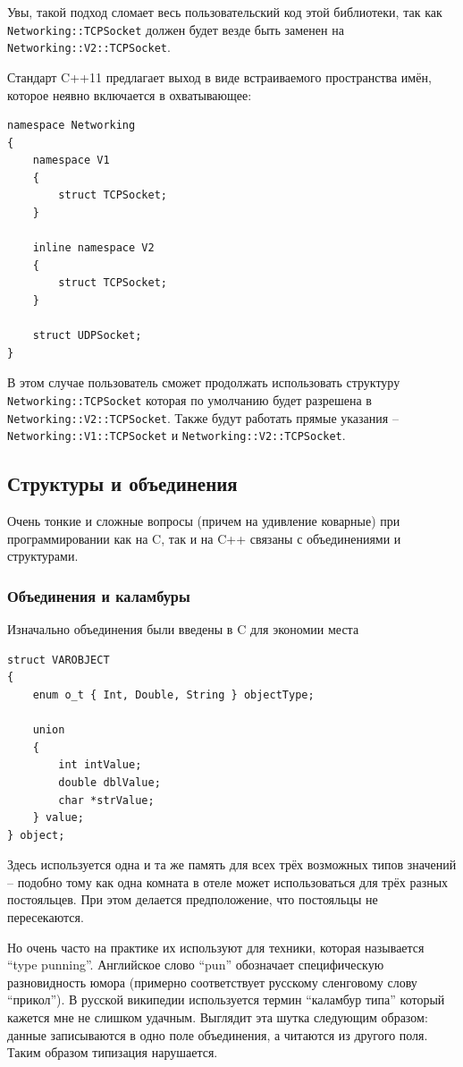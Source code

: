 \documentclass[a4paper,12pt,oneside]{article}
\begin{document}
Увы, такой подход сломает весь пользовательский код этой библиотеки, так как \lstinline!Networking::TCPSocket! должен будет везде быть заменен на \lstinline!Networking::V2::TCPSocket!.

Стандарт C++11 предлагает выход в виде встраиваемого пространства имён, которое неявно включается в охватывающее:

\begin{lstlisting}
namespace Networking 
{
    namespace V1 
    {
        struct TCPSocket;
    }
     
    inline namespace V2 
    {
        struct TCPSocket;
    }
 
    struct UDPSocket;
}
\end{lstlisting}

В этом случае пользователь сможет продолжать использовать структуру \lstinline!Networking::TCPSocket! которая по умолчанию будет разрешена в \lstinline!Networking::V2::TCPSocket!. Также будут работать прямые указания -- \lstinline!Networking::V1::TCPSocket! и \lstinline!Networking::V2::TCPSocket!.

\subsection{Структуры и объединения}

Очень тонкие и сложные вопросы (причем на удивление коварные) при программировании как на C, так и на C++ связаны с объединениями и структурами.

\subsubsection{Объединения и каламбуры}

Изначально объединения были введены в C для экономии места

\begin{lstlisting}
struct VAROBJECT
{
    enum o_t { Int, Double, String } objectType;

    union
    {
        int intValue;
        double dblValue;
        char *strValue;
    } value;
} object;
\end{lstlisting}

Здесь используется одна и та же память для всех трёх возможных типов значений -- подобно тому как одна комната в отеле может использоваться для трёх разных постояльцев. При этом делается предположение, что постояльцы не пересекаются.

Но очень часто на практике их используют для техники, которая называется ``type punning''. Английское слово ``pun'' обозначает специфическую разновидность юмора (примерно соответствует русскому сленговому слову ``прикол''). В русской википедии используется термин ``каламбур типа'' который кажется мне не слишком удачным. Выглядит эта шутка следующим образом: данные записываются в одно поле объединения, а читаются из другого поля. Таким образом типизация нарушается.
\end{document}
